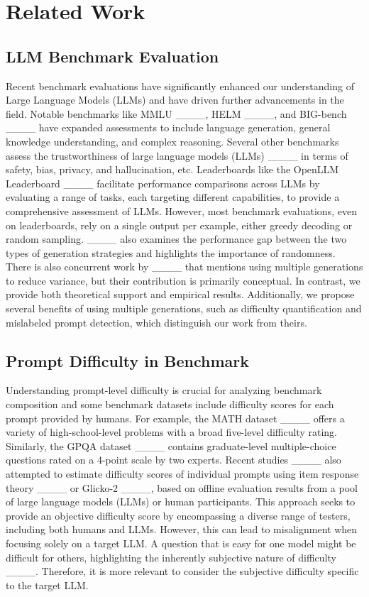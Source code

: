 \section{Related Work}
\subsection{LLM Benchmark Evaluation}
Recent benchmark evaluations have significantly enhanced our understanding of Large Language Models (LLMs) and have driven further advancements in the field. Notable benchmarks like MMLU ____, HELM ____, and BIG-bench ____ have expanded assessments to include language generation, general knowledge understanding, and complex reasoning. Several other benchmarks assess the trustworthiness of large language models (LLMs) ____ in terms of safety, bias, privacy, and hallucination, etc. Leaderboards like the OpenLLM Leaderboard ____ facilitate performance comparisons across LLMs by evaluating a range of tasks, each targeting different capabilities, to provide a comprehensive assessment of LLMs. However, most benchmark evaluations, even on leaderboards, rely on a single output per example, either greedy decoding or random sampling. ____ also examines the performance gap between the two types of generation strategies and highlights the importance of randomness. There is also concurrent work by ____ that mentions using multiple generations to reduce variance, but their contribution is primarily conceptual. In contrast, we provide both theoretical support and empirical results. Additionally, we propose several benefits of using multiple generations, such as difficulty quantification and mislabeled prompt detection, which distinguish our work from theirs.

\subsection{Prompt Difficulty in Benchmark}
Understanding prompt-level difficulty is crucial for analyzing benchmark composition and some benchmark datasets include difficulty scores for each prompt provided by humans. For example, the MATH dataset ____ offers a variety of high-school-level problems with a broad five-level difficulty rating. Similarly, the GPQA dataset ____ contains graduate-level multiple-choice questions rated on a 4-point scale by two experts. Recent studies ____ also attempted to estimate difficulty scores of individual prompts using item response theory ____ or Glicko-2 ____, based on offline evaluation results from a pool of large language models (LLMs) or human participants. This approach seeks to provide an objective difficulty score by encompassing a diverse range of testers, including both humans and LLMs. However, this can lead to misalignment when focusing solely on a target LLM. A question that is easy for one model might be difficult for others, highlighting the inherently subjective nature of difficulty ____. Therefore, it is more relevant to consider the subjective difficulty specific to the target LLM.